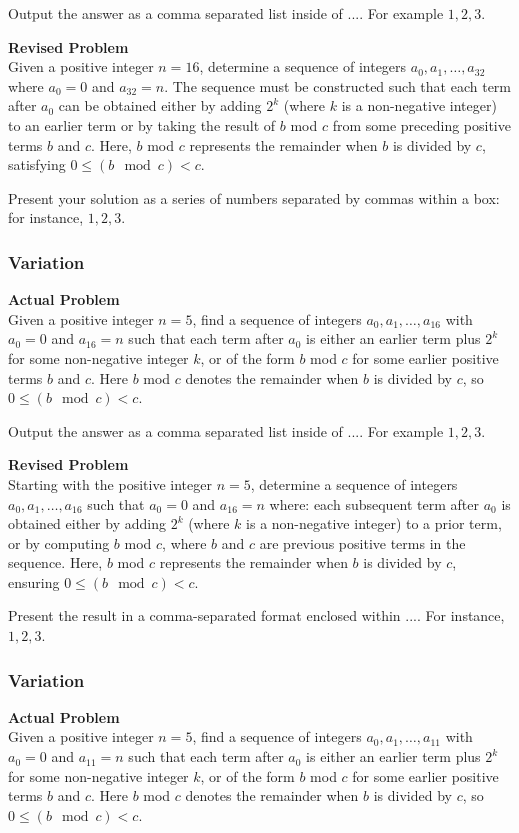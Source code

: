 Output the answer as a comma separated list inside of $\boxed{...}$. For example $\boxed{1, 2, 3}$.

\textbf{Revised Problem}\\
Given a positive integer $n = 16$, determine a sequence of integers $a_0, a_1, \ldots, a_{32}$ where $a_0 = 0$ and $a_{32} = n$. The sequence must be constructed such that each term after $a_0$ can be obtained either by adding $2^k$ (where $k$ is a non-negative integer) to an earlier term or by taking the result of $b$ mod $c$ from some preceding positive terms $b$ and $c$. Here, $b$ mod $c$ represents the remainder when $b$ is divided by $c$, satisfying $0 \leq (b \mod c) < c$.

Present your solution as a series of numbers separated by commas within a box: for instance, $\boxed{1, 2, 3}$.

\subsubsection{Variation}
\textbf{Actual Problem}\\
Given a positive integer $n = 5$, find a sequence of integers $a_0, a_1, \ldots, a_{16}$ with $a_0 = 0$ and $a_{16} = n$ such that
each term after $a_0$ is either an earlier term plus $2^k$ for some non-negative integer $k$, or of the form $b$ mod $c$ for some earlier positive terms $b$ and $c$.
Here $b$ mod $c$ denotes the remainder when $b$ is divided by $c$, so $0 \leq (b \mod c) < c$.

Output the answer as a comma separated list inside of $\boxed{...}$. For example $\boxed{1, 2, 3}$.

\textbf{Revised Problem}\\
Starting with the positive integer $n = 5$, determine a sequence of integers $a_0, a_1, \ldots, a_{16}$ such that $a_0 = 0$ and $a_{16} = n$ where:
each subsequent term after $a_0$ is obtained either by adding $2^k$ (where $k$ is a non-negative integer) to a prior term, or by computing $b$ mod $c$, where $b$ and $c$ are previous positive terms in the sequence. Here, $b$ mod $c$ represents the remainder when $b$ is divided by $c$, ensuring $0 \leq (b \mod c) < c$.

Present the result in a comma-separated format enclosed within $\boxed{...}$. For instance, $\boxed{1, 2, 3}$.

\subsubsection{Variation}
\textbf{Actual Problem}\\
Given a positive integer $n = 5$, find a sequence of integers $a_0, a_1, \ldots, a_{11}$ with $a_0 = 0$ and $a_{11} = n$ such that
each term after $a_0$ is either an earlier term plus $2^k$ for some non-negative integer $k$, or of the form $b$ mod $c$ for some earlier positive terms $b$ and $c$.
Here $b$ mod $c$ denotes the remainder when $b$ is divided by $c$, so $0 \leq (b \mod c) < c$.

